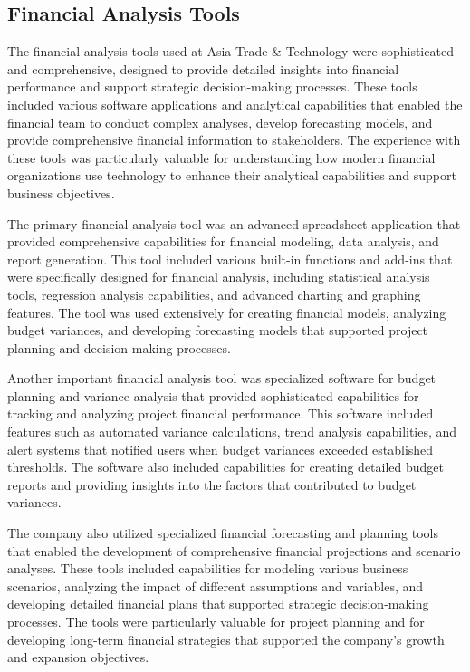 \subsection{Financial Analysis Tools}
The financial analysis tools used at Asia Trade \& Technology were sophisticated and comprehensive, designed to provide detailed insights into financial performance and support strategic decision-making processes. These tools included various software applications and analytical capabilities that enabled the financial team to conduct complex analyses, develop forecasting models, and provide comprehensive financial information to stakeholders. The experience with these tools was particularly valuable for understanding how modern financial organizations use technology to enhance their analytical capabilities and support business objectives.

The primary financial analysis tool was an advanced spreadsheet application that provided comprehensive capabilities for financial modeling, data analysis, and report generation. This tool included various built-in functions and add-ins that were specifically designed for financial analysis, including statistical analysis tools, regression analysis capabilities, and advanced charting and graphing features. The tool was used extensively for creating financial models, analyzing budget variances, and developing forecasting models that supported project planning and decision-making processes.

Another important financial analysis tool was specialized software for budget planning and variance analysis that provided sophisticated capabilities for tracking and analyzing project financial performance. This software included features such as automated variance calculations, trend analysis capabilities, and alert systems that notified users when budget variances exceeded established thresholds. The software also included capabilities for creating detailed budget reports and providing insights into the factors that contributed to budget variances.

The company also utilized specialized financial forecasting and planning tools that enabled the development of comprehensive financial projections and scenario analyses. These tools included capabilities for modeling various business scenarios, analyzing the impact of different assumptions and variables, and developing detailed financial plans that supported strategic decision-making processes. The tools were particularly valuable for project planning and for developing long-term financial strategies that supported the company's growth and expansion objectives.

